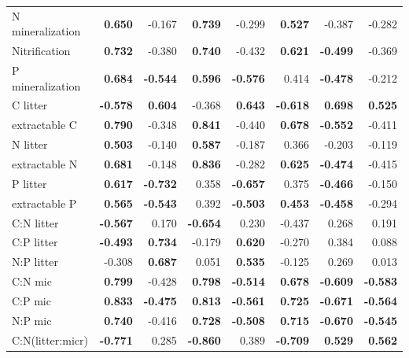 \documentclass[10pt]{article}
\begin{document}
\begin{flushleft}
\begin{landscape}
\begin{table}[h!]
{\begin{tabular}{lrrrrrrr}
  N mineralization & \textbf{ 0.650 } & -0.167 & \textbf{ 0.739 } & -0.299 & \textbf{ 0.527 } & -0.387 & -0.282 \\ 
  Nitrification & \textbf{ 0.732 } & -0.380 & \textbf{ 0.740 } & -0.432 & \textbf{ 0.621 } & \textbf{ -0.499 } & -0.369 \\ 
  P mineralization & \textbf{ 0.684 } & \textbf{ -0.544 } & \textbf{ 0.596 } & \textbf{ -0.576 } & 0.414 & \textbf{ -0.478 } & -0.212 \\ 
  C litter & \textbf{ -0.578 } & \textbf{ 0.604 } & -0.368 & \textbf{ 0.643 } & \textbf{ -0.618 } & \textbf{ 0.698 } & \textbf{ 0.525 } \\ 
  extractable C & \textbf{ 0.790 } & -0.348 & \textbf{ 0.841 } & -0.440 & \textbf{ 0.678 } & \textbf{ -0.552 } & -0.411 \\ 
  N litter & \textbf{ 0.503 } & -0.140 & \textbf{ 0.587 } & -0.187 & 0.366 & -0.203 & -0.119 \\ 
  extractable N & \textbf{ 0.681 } & -0.148 & \textbf{ 0.836 } & -0.282 & \textbf{ 0.625 } & \textbf{ -0.474 } & -0.415 \\ 
  P litter & \textbf{ 0.617 } & \textbf{ -0.732 } & 0.358 & \textbf{ -0.657 } & 0.375 & \textbf{ -0.466 } & -0.150 \\ 
  extractable P & \textbf{ 0.565 } & \textbf{ -0.543 } & 0.392 & \textbf{ -0.503 } & \textbf{ 0.453 } & \textbf{ -0.458 } & -0.294 \\ 
  C:N litter & \textbf{ -0.567 } & 0.170 & \textbf{ -0.654 } & 0.230 & -0.437 & 0.268 & 0.191 \\ 
  C:P litter & \textbf{ -0.493 } & \textbf{ 0.734 } & -0.179 & \textbf{ 0.620 } & -0.270 & 0.384 & 0.088 \\ 
  N:P litter & -0.308 & \textbf{ 0.687 } & 0.051 & \textbf{ 0.535 } & -0.125 & 0.269 & 0.013 \\ 
  C:N mic & \textbf{ 0.799 } & -0.428 & \textbf{ 0.798 } & \textbf{ -0.514 } & \textbf{ 0.678 } & \textbf{ -0.609 } & \textbf{ -0.583 } \\ 
  C:P mic & \textbf{ 0.833 } & \textbf{ -0.475 } & \textbf{ 0.813 } & \textbf{ -0.561 } & \textbf{ 0.725 } & \textbf{ -0.671 } & \textbf{ -0.564 } \\ 
  N:P mic & \textbf{ 0.740 } & -0.416 & \textbf{ 0.728 } & \textbf{ -0.508 } & \textbf{ 0.715 } & \textbf{ -0.670 } & \textbf{ -0.545 } \\ 
  C:N(litter:micr) & \textbf{ -0.771 } & 0.285 & \textbf{ -0.860 } & 0.389 & \textbf{ -0.709 } & \textbf{ 0.529 } & \textbf{ 0.562 } \\ 

\end{tabular}}
\end{table}
\end{landscape}
\end{flushleft}
\end{document}
